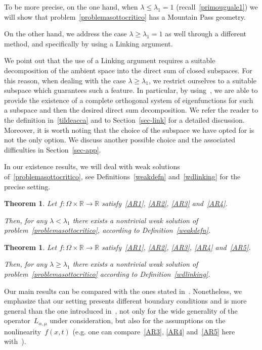 \documentclass[12pt,a4paper,intlimits,sumlimits]{amsart}
\def \R {\mathbb{R}}
\theoremstyle{definition}
\theoremstyle{plain}
\newtheorem{theorem}[definition]{Theorem}
\numberwithin{equation}{section}
\renewcommand{\le}{\leqslant}
\renewcommand{\ge}{\geqslant}
\begin{document}
To be more precise, on the one hand, when $\lambda\le\lambda_1=1$ (recall~\eqref{primouguale1}) we will show that problem~\eqref{problemasottocritico} has a Mountain Pass geometry.

On the other hand, we address the case $\lambda\ge\lambda_1=1$ as well
through a different method, and specifically
by using a Linking argument. 

We point out that the use of a Linking argument requires a suitable decomposition of the ambient space into the direct sum of closed subspaces. For this reason, when dealing with the case $\lambda\ge\lambda_1$, we restrict ourselves to a suitable subspace which guarantees such a feature. In particular, by using~\cite[Theorem~1.5]{TUTTI}, we are able to provide the existence of a complete orthogonal system of eigenfunctions for such a subspace and then the desired direct sum decomposition. We refer the reader to the definition in~\eqref{tildeacca} and to Section~\ref{sec-link} for a detailed discussion.
Moreover, it is worth noting that the choice of the subspace we have opted for is not the only option. We discuss another possible choice and the associated difficulties in Section~\ref{sec-app}.
\medskip

In our existence results, we will deal with weak solutions of~\eqref{problemasottocritico}, see Definitions~\ref{weakdefn} and~\ref{wdlinking} for the precise setting.

\begin{theorem}\label{MPT}
Let $f:\Omega\times \R \to \R$ satisfy~\eqref{AR1}, \eqref{AR2},  \eqref{AR3} and~\eqref{AR4}.

Then, for any $\lambda<\lambda_1$ there exists a nontrivial weak solution of problem~\eqref{problemasottocritico},
according to Definition~\ref{weakdefn}.
\end{theorem}

\begin{theorem}\label{LINK}
Let $f:\Omega\times \R \to \R$ satisfy~\eqref{AR1}, \eqref{AR2},  \eqref{AR3}, \eqref{AR4} and~\eqref{AR5}. 

Then, for any $\lambda\ge\lambda_1$ there exists a nontrivial weak
solution of problem~\eqref{problemasottocritico} according to
Definition~\ref{wdlinking}.
\end{theorem}

Our main results can be compared with the ones stated in~\cite[Theorems~1 and~2]{MR3002745}. Nonetheless, we emphasize that our setting presents different boundary conditions and is more general than the one introduced in~\cite{MR3002745}, not only for the wide generality of the operator~$L_{\alpha, \mu}$ under consideration, but also for the assumptions on the nonlinearity~$f(x, t)$ (e.g. one can compare~\eqref{AR3}, \eqref{AR4} and~\eqref{AR5} here with~\cite[formulas~(1.11), (1.14) and~(1.15)]{MR3002745}).
\end{document}
